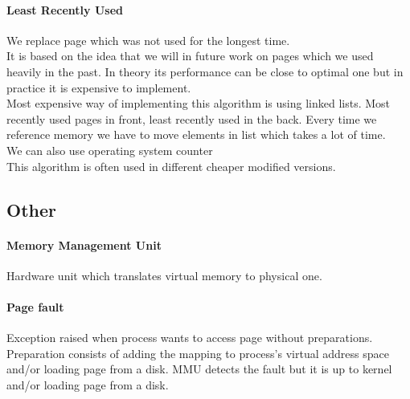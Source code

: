 \paragraph{Least Recently Used}
We replace page which was not used for the longest time. \\
It is based on the idea that we will in future work on pages which we used
heavily in the past. In theory its performance can be close to optimal one but
in practice it is expensive to implement. \\
Most expensive way of implementing this algorithm is using linked lists. Most
recently used pages in front, least recently used in the back. Every time we
reference memory we have to move elements in list which takes a lot of time. \\
We can also use operating system counter \\
This algorithm is often used in different cheaper modified versions.
\cite{Page Replacement Algorithms}
\cite{pageWiki}
\subsection{Other}
\paragraph{Memory Management Unit} 
Hardware unit which translates virtual memory to physical one.
\cite{mmuWiki}
\paragraph{Page fault}
Exception raised when process wants to access page without preparations.
Preparation consists of adding the mapping to process's virtual address space
and/or loading page from a disk. MMU detects the fault but it is up to kernel
and/or loading page from a disk. 

